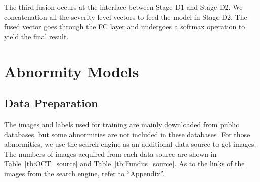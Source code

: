 \documentclass{article}
\begin{document}
	The third fusion occurs at the interface between Stage D1 and Stage D2. We concatenation all the severity level vectors to feed the model in Stage D2. The fused vector goes through the FC layer and undergoes a softmax operation to yield the final result.
	
	\section{Abnormity Models}
	
	\subsection{Data Preparation}
	
	The images and labels used for training are mainly downloaded from public databases, but some abnormities are not included in these databases. For those abnormities, we use the search engine as an additional data source to get images. The numbers of images acquired from each data source are shown in Table~\ref{tb:OCT_source} and Table~\ref{tb:Fundus_source}. As to the links of the images from the search engine, refer to ``Appendix''. 
	
\end{document}
